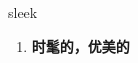 
\begin{frame}
{\huge sleek}
\begin{center}
\begin{enumerate}\Large
  \item \textbf{时髦的，优美的}
\end{enumerate}
\end{center}
\end{frame}

